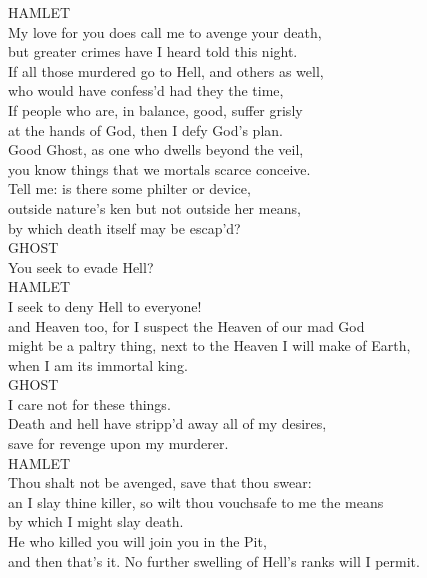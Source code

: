 \noindent{}HAMLET\\
My love for you does call me to avenge your death,\\
but greater crimes have I heard told this night.\\
If all those murdered go to Hell, and others as well,\\
who would have confess'd had they the time,\\
If people who are, in balance, good, suffer grisly\\
at the hands of God, then I defy God's plan.\\

\noindent{}Good Ghost, as one who dwells beyond the veil,\\
you know things that we mortals scarce conceive.\\
Tell me: is there some philter or device,\\
outside nature's ken but not outside her means,\\
by which death itself may be escap'd?\\

\noindent{}GHOST\\
You seek to evade Hell?\\

\noindent{}HAMLET\\
I seek to deny Hell to everyone!\\
and Heaven too, for I suspect the Heaven of our mad God\\
might be a paltry thing, next to the Heaven I will make of Earth,\\
when I am its immortal king.\\

\noindent{}GHOST\\
I care not for these things.\\
Death and hell have stripp'd away all of my desires,\\
save for revenge upon my murderer.\\

\noindent{}HAMLET\\
Thou shalt not be avenged, save that thou swear:\\
an I slay thine killer, so wilt thou vouchsafe to me the means\\
by which I might slay death.\\

\noindent{}He who killed you will join you in the Pit,\\
and then that's it. No further swelling of Hell's ranks will I permit.\\


